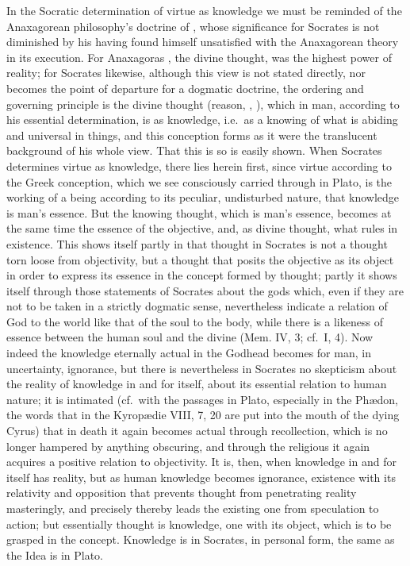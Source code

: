 In the Socratic determination of virtue as knowledge we must
be reminded of the Anaxagorean philosophy's doctrine of , whose
significance for Socrates is not diminished by his having found himself
unsatisfied with the Anaxagorean theory in its execution.
For Anaxagoras , the divine thought, was the highest power of reality; for Socrates likewise, although this
view is not stated directly, nor becomes the point of departure for
a dogmatic doctrine, the ordering and governing principle is the
divine thought (reason, , ), which in man, according to his essential determination, is as knowledge, i.e.\ as a
knowing of what is abiding and universal in things, and this conception forms as it were the translucent background of
his whole view. That this is so is easily
shown. When Socrates determines virtue as knowledge, there lies
herein first, since virtue according to the Greek conception, which we see
consciously carried through in Plato, is the working of a being according to its
peculiar, undisturbed nature, that knowledge is man's
essence. But the knowing thought, which is man's essence,
becomes at the same time the essence of the objective, and, as divine thought,
what rules in existence. This shows itself partly in that
thought in Socrates is not a thought torn loose from objectivity,
but a thought that posits the objective as its
object in order to express its essence in the concept formed by thought; partly it shows itself through those statements of Socrates about the gods which, even if they are not to be taken in a strictly
dogmatic sense, nevertheless indicate a relation of God to the world
like that of the soul to the body, while there is a likeness of essence
between the human soul and the divine (Mem.
IV, 3; cf.\ I, 4). Now indeed the knowledge eternally actual in the Godhead becomes for man, in uncertainty, ignorance, but
there is nevertheless in Socrates no skepticism about the reality of knowledge in
and for itself, about its essential relation to human nature;
it is intimated (cf.\ with the passages in Plato, especially in the Phædon, the words that in the Kyropædie VIII, 7, 20 are put into the mouth of the dying
Cyrus) that in death it again becomes actual through recollection, which is no longer hampered by anything obscuring,
and through the religious it again acquires a positive relation
to objectivity. It is, then, when knowledge in and for itself has
reality, but as human knowledge becomes ignorance,
existence with its relativity and opposition that prevents thought from penetrating reality masteringly,
and precisely thereby leads the existing one from speculation to action; but essentially thought is knowledge, one with its object,
which is to be grasped in the concept. Knowledge is in Socrates, in personal form, the same as the Idea is in Plato.

